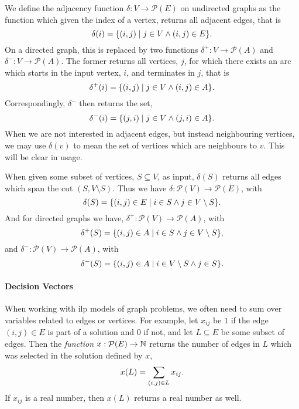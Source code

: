 We define the adjacency function $\delta : V \to \mathcal{P} (E)$ on undirected graphs as
the function which given the index of a vertex, returns all adjacent edges, that is
$$\delta(i) = \{(i,j) \mid j \in V \wedge (i, j) \in E\}\mathnormal{.}$$
On a directed graph, this is replaced by two functions
$\delta^+ : V \to \mathcal{P} (A)$
and $\delta^-: V \to \mathcal{P} (A)$.
The former returns all vertices, $j$, for which there exists an arc
which starts in the input vertex, $i$, and terminates in $j$, that is
$$\delta^+(i) = \{(i, j) \mid j \in V \wedge (i, j) \in A\}\mathnormal{.}$$
Correspondingly, $\delta^-$ then returns the set,
$$\delta^-(i) = \{(j, i) \mid j \in V \wedge (j, i) \in A\}\mathnormal{.}$$
When we are not interested in adjacent edges, but instead neighbouring vertices,
we may use $\delta(v)$ to mean the set of vertices which are neighbours to $v$.
This will be clear in usage.


When given some subset of vertices, $S \subseteq V$, as input,
$\delta(S)$ returns all edges which span the cut $(S, V \setminus S)$.
Thus we have $\delta : \mathcal{P}(V) \to \mathcal{P}(E)$, with
$$\delta(S) = \{(i,j) \in E \mid i \in S \wedge j \in V \setminus S\}\mathnormal{.}$$
And for directed graphs we have, $\delta^+ : \mathcal{P}(V) \to \mathcal{P}(A)$, with
$$\delta^+(S) = \{(i,j) \in A \mid i \in S \wedge j \in V \setminus S\}\mathnormal{,}$$
and $\delta^- : \mathcal{P}(V) \to \mathcal{P}(A)$, with
$$\delta^-(S) = \{(i,j) \in A \mid i \in V \setminus S \wedge j \in S\}\mathnormal{.}$$

\paragraph{Decision Vectors}

When working with \gls{ilp} models of graph problems, we often need to sum over variables
related to edges or vertices. For example, let $x_{ij}$ be $1$ if the edge $(i,j) \in E$
is part of a solution and $0$ if not, and let $L \subseteq E$ be some subset of edges.
Then the \textit{function} $x : \mathcal{P} (E) \to \mathbb{N}$ returns the number of edges
 in $L$ which was selected in the solution defined by $x$,
 $$x(L) = \sum_{(i, j) \in L} x_{ij}\mathnormal{.}$$
 If $x_{ij}$ is a real number, then $x(L)$ returns a real number as well.

\clearpage
\glsaddall
\printglossaries

